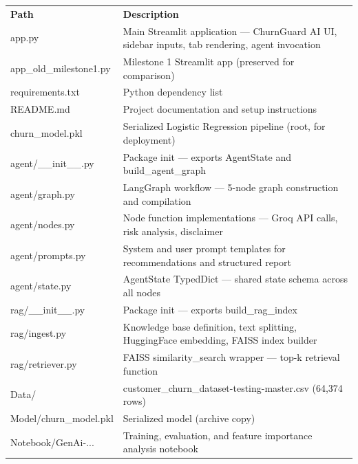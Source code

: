 \documentclass[12pt, a4paper]{article}
\begin{document}
\begin{table}[H]
\centering
\renewcommand{\arraystretch}{1.3}
\begin{tabular}{@{} >{\columncolor{lightrow}\ttfamily}p{4.5cm} p{9cm} @{}}
\rowcolor{darkheader}
\textbf{\color{white}Path} & \textbf{\color{white}Description} \\
\textnormal{app.py} & Main Streamlit application --- ChurnGuard AI UI, sidebar inputs, tab rendering, agent invocation \\
\rowcolor{white}
\textnormal{app\_old\_milestone1.py} & Milestone 1 Streamlit app (preserved for comparison) \\
\textnormal{requirements.txt} & Python dependency list \\
\rowcolor{white}
\textnormal{README.md} & Project documentation and setup instructions \\
\textnormal{churn\_model.pkl} & Serialized Logistic Regression pipeline (root, for deployment) \\
\rowcolor{white}
\textnormal{agent/\_\_init\_\_.py} & Package init --- exports AgentState and build\_agent\_graph \\
\textnormal{agent/graph.py} & LangGraph workflow --- 5-node graph construction and compilation \\
\rowcolor{white}
\textnormal{agent/nodes.py} & Node function implementations --- Groq API calls, risk analysis, disclaimer \\
\textnormal{agent/prompts.py} & System and user prompt templates for recommendations and structured report \\
\rowcolor{white}
\textnormal{agent/state.py} & AgentState TypedDict --- shared state schema across all nodes \\
\textnormal{rag/\_\_init\_\_.py} & Package init --- exports build\_rag\_index \\
\rowcolor{white}
\textnormal{rag/ingest.py} & Knowledge base definition, text splitting, HuggingFace embedding, FAISS index builder \\
\textnormal{rag/retriever.py} & FAISS similarity\_search wrapper --- top-k retrieval function \\
\rowcolor{white}
\textnormal{Data/} & customer\_churn\_dataset-testing-master.csv (64,374 rows) \\
\textnormal{Model/churn\_model.pkl} & Serialized model (archive copy) \\
\rowcolor{white}
\textnormal{Notebook/GenAi-...} & Training, evaluation, and feature importance analysis notebook \\
\end{tabular}
\end{table}
\end{document}
